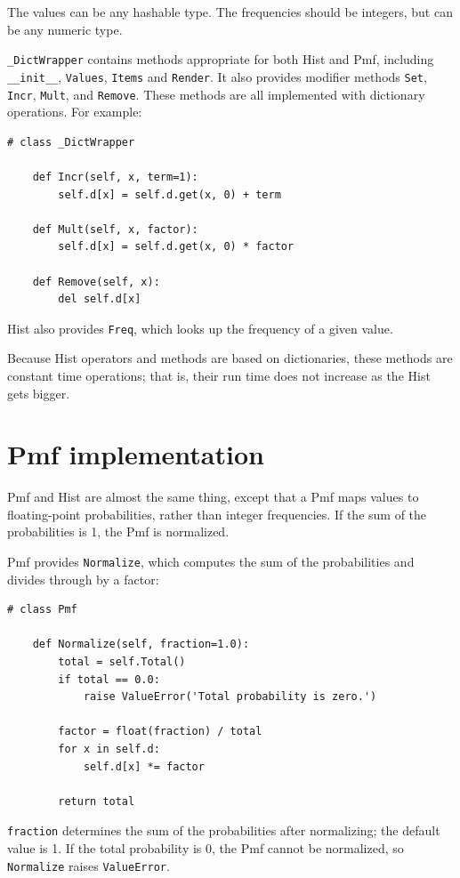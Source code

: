 \documentclass[12pt]{book}
\begin{document}
The values can be any hashable type.  The frequencies should be integers,
but can be any numeric type.

\verb"_DictWrapper" contains methods appropriate for both
Hist and Pmf, including \verb"__init__", \verb"Values",
\verb"Items" and \verb"Render".  It also provides modifier
methods \verb"Set", \verb"Incr", \verb"Mult", and \verb"Remove".  These
methods are all implemented with dictionary operations.  For example:

\begin{verbatim}
# class _DictWrapper

    def Incr(self, x, term=1):
        self.d[x] = self.d.get(x, 0) + term

    def Mult(self, x, factor):
        self.d[x] = self.d.get(x, 0) * factor

    def Remove(self, x):
        del self.d[x]
\end{verbatim}

Hist also provides \verb"Freq", which looks up the frequency
of a given value.

Because Hist operators and methods are based on dictionaries,
these methods are constant time operations;
that is, their run time does not increase as the Hist gets bigger.


\section{Pmf implementation}

Pmf and Hist are almost the same thing, except that a Pmf
maps values to floating-point probabilities, rather than integer
frequencies.  If the sum of the probabilities is 1, the Pmf is normalized.

Pmf provides \verb"Normalize", which computes the sum of the
probabilities and divides through by a factor:

\begin{verbatim}
# class Pmf

    def Normalize(self, fraction=1.0):
        total = self.Total()
        if total == 0.0:
            raise ValueError('Total probability is zero.')

        factor = float(fraction) / total
        for x in self.d:
            self.d[x] *= factor

        return total
\end{verbatim}

\verb"fraction" determines the sum of the probabilities after
normalizing; the default value is 1.  If the total probability is 0,
the Pmf cannot be normalized, so \verb"Normalize" raises \verb"ValueError".
\end{document}
